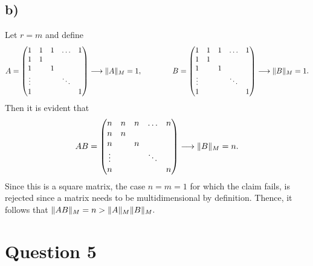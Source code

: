 \documentclass[12pt]{article}
\DeclarePairedDelimiter{\norm}{\lVert}{\rVert}
\theoremstyle{definition}
\theoremstyle{definition}
\theoremstyle{definition}
\theoremstyle{definition}
\theoremstyle{definition}
\theoremstyle{example}
\theoremstyle{note}
\theoremstyle{remark}
\theoremstyle{example}
\begin{document}
			\subsection*{b) }
				Let $r=m$ and define 
				\begin{equation*}
					 A = \begin{pmatrix}
					 	1 & 1 & 1 & \dots & 1 \\
					 	1 & 1 &  &  & \\
					 	1 & & 1 & & \\
					 	\vdots  & & &\ddots & \\
					 	1 & & & & 1
					 \end{pmatrix} \longrightarrow \norm{A}_{M} = 1, \qquad \qquad  
					 B = \begin{pmatrix}
					 1 & 1 & 1 & \dots & 1 \\
					 1 & 1 &  &  & \\
					 1 & & 1 & & \\
					 \vdots  & & &\ddots & \\
					 1 & & & & 1
					 \end{pmatrix} \longrightarrow \norm{B}_{M} = 1 .
				\end{equation*}
				Then it is evident that 
				\begin{equation*}
					AB = \begin{pmatrix}
					n & n & n & \dots & n \\
					n & n &  &  & \\
					n & & n & & \\
					\vdots  & & &\ddots & \\
					n & & & & n
					\end{pmatrix} \longrightarrow \norm{B}_{M} = n. 
				\end{equation*}
				Since this is a square matrix, the case $n=m=1$ for which the claim fails, is rejected since a matrix needs to be multidimensional by definition. Thence, it follows that $\norm{AB}_{M} =n > \norm{A}_{M}\norm{B}_{M}.$
			\section*{Question 5}
\end{document}
